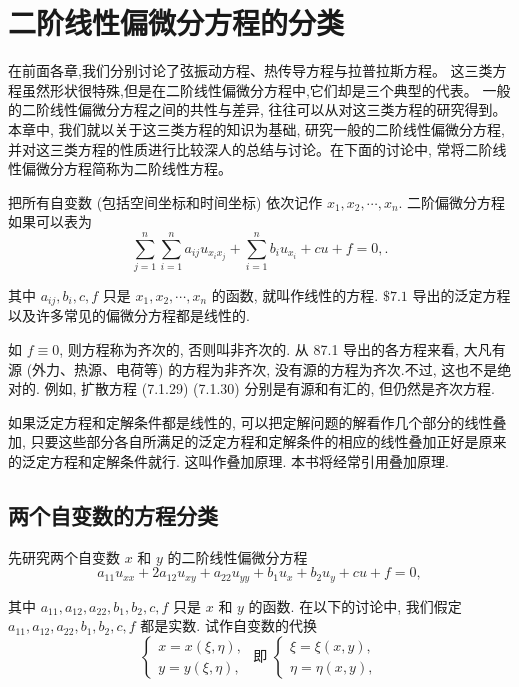 \section{二阶线性偏微分方程的分类}
在前面各章,我们分别讨论了弦振动方程、热传导方程与拉普拉斯方程。
这三类方程虽然形状很特殊,但是在二阶线性偏微分方程中,它们却是三个典型的代表。
一般的二阶线性偏微分方程之间的共性与差异, 往往可以从对这三类方程的研究得到。
本章中, 我们就以关于这三类方程的知识为基础, 研究一般的二阶线性偏微分方程, 并对这三类方程的性质进行比较深人的总结与讨论。在下面的讨论中, 常将二阶线性偏微分方程简称为二阶线性方程。


把所有自变数 (包括空间坐标和时间坐标) 依次记作 $x_1, x_2, \cdots, x_n$. 二阶偏微分方程如果可以表为
$$
\sum_{j=1}^n \sum_{i=1}^n a_{i j} u_{x_i x_j}+\sum_{i=1}^n b_i u_{x_i}+c u+f=0, .
$$

其中 $a_{i j}, b_i, c, f$ 只是 $x_1, x_2, \cdots, x_n$ 的函数, 就叫作线性的方程. $\$ 7.1$ 导出的泛定方程以及许多常见的偏微分方程都是线性的.

如 $f \equiv 0$, 则方程称为齐次的, 否则叫非齐次的. 从 87.1 导出的各方程来看, 大凡有源 (外力、热源、电荷等) 的方程为非齐次, 没有源的方程为齐次.不过, 这也不是绝对的. 
例如, 扩散方程 (7.1.29) (7.1.30) 分别是有源和有汇的, 但仍然是齐次方程.

如果泛定方程和定解条件都是线性的, 可以把定解问题的解看作几个部分的线性叠加,
 只要这些部分各自所满足的泛定方程和定解条件的相应的线性叠加正好是原来的泛定方程和定解条件就行. 
 这叫作叠加原理. 本书将经常引用叠加原理.

 \subsection{两个自变数的方程分类}

 先研究两个自变数 $x$ 和 $y$ 的二阶线性偏微分方程
$$
a_{11} u_{x x}+2 a_{12} u_{x y}+a_{22} u_{y y}+b_1 u_x+b_2 u_y+c u+f=0,
$$

其中 $a_{11}, a_{12}, a_{22}, b_1, b_2, c, f$ 只是 $x$ 和 $y$ 的函数. 在以下的讨论中, 我们假定 $a_{11}, a_{12}, a_{22}, b_1, b_2, c, f$ 都是实数.
试作自变数的代换
$$
\left\{\begin{array} { l } 
{ x = x ( \xi , \eta ) , } \\
{ y = y ( \xi , \eta ) , }
\end{array} \text { 即 } \left\{\begin{array}{l}
\xi=\xi(x, y), \\
\eta=\eta(x, y),
\end{array}\right.\right.
$$

